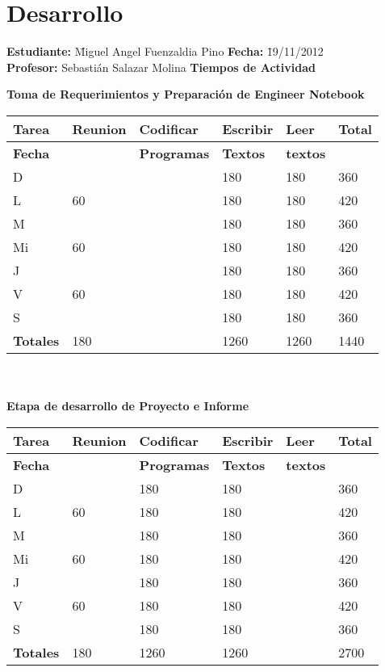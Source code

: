 \documentclass[a4paper,12pt,openany,oneside]{book}
\begin{document}
\section{Desarrollo}
\newpage
\begin{tabbing}
\textbf{Estudiante:} \= Miguel Angel Fuenzaldia Pino \= \textbf{Fecha:} \= 19/11/2012\\
\textbf{Profesor:} \> Sebastián Salazar Molina \> \textbf{Tiempos de Actividad} \>  \\
\end{tabbing}
\textbf{Toma de Requerimientos y Preparación de Engineer Notebook}\\
\begin{tabular}{| l | l | l | l | l | l |}
\hline
\textbf{Tarea} & \textbf{Reunion} & \textbf{Codificar} & \textbf{Escribir} & \textbf{Leer} & \textbf{Total} \\
\hline
\textbf{Fecha} &                  & \textbf{Programas} & \textbf{Textos} & \textbf{textos} & \\
\hline
D  &    & & 180 & 180 & 360 \\
\hline
L  & 60 & & 180 & 180 & 420 \\
\hline
M  &    & & 180 & 180 & 360 \\
\hline
Mi & 60 & & 180 & 180 & 420 \\
\hline
J  &    & & 180 & 180 & 360 \\
\hline
V  & 60 & & 180 & 180 & 420 \\
\hline
S  &    & & 180 & 180 & 360 \\
\hline
\textbf{Totales} & 180 & & 1260 & 1260 & 1440 \\
\hline
\end{tabular}
\\\\
\textbf{Etapa de desarrollo de Proyecto e Informe}\\
\begin{tabular}{| l | l | l | l | l | l |}
\hline
\textbf{Tarea} & \textbf{Reunion} & \textbf{Codificar} & \textbf{Escribir} & \textbf{Leer} & \textbf{Total} \\
\hline
\textbf{Fecha} &                  & \textbf{Programas} & \textbf{Textos} & \textbf{textos} & \\
\hline
D  &    & 180 & 180 &  & 360 \\
\hline
L  & 60 & 180 & 180 &  & 420 \\
\hline
M  &    & 180 & 180 &  & 360 \\
\hline
Mi & 60 & 180 & 180 &  & 420 \\
\hline
J  &    & 180 & 180 &  & 360 \\
\hline
V  & 60 & 180 & 180 &  & 420 \\
\hline
S  &    & 180 & 180 &  & 360 \\
\hline
\textbf{Totales} & 180 & 1260 & 1260 &  & 2700 \\
\hline
\end{tabular}
\end{document}
